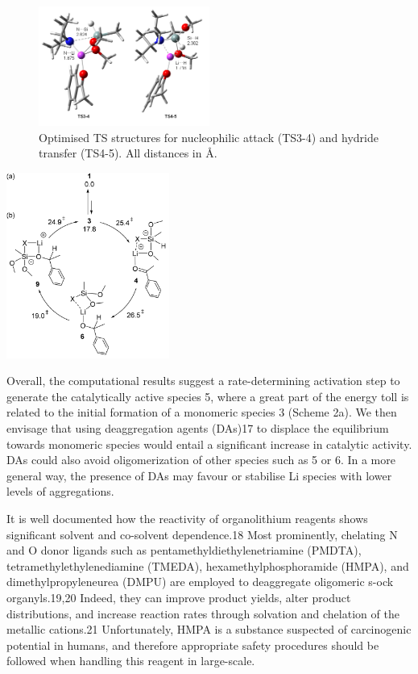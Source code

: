 \documentclass[journal=jacsat,manuscript=article]{achemso}
\begin{document}
	\begin{figure}[H]
		\includegraphics[width=0.5\textwidth]{figures/Nucleophilic attack.PNG}	
		\centering
		\caption{Optimised TS structures for nucleophilic attack (TS3-4) and hydride transfer (TS4-5). All distances in \si{\angstrom}.}
		\label{Figure1}
	\end{figure}	
	
	\begin{scheme}[H]
		\includegraphics[width=0.4\textwidth]{figures/Cycle.PNG}		
		\centering
		\caption{Computed (a) pre-activation step and (b) catalytic cycle the alkoxy-silicate-mediated Li-catalysed hydrosilylation of acetophenone. All Gibbs energies are given in THF in kcal mol-1.}
		\label{Scheme 3}
	\end{scheme}	
	
	Overall, the computational results suggest a rate-determining activation step to generate the catalytically active species 5, where a great part of the energy toll is related to the initial formation of a monomeric species 3 (Scheme 2a). We then envisage that using deaggregation agents (DAs)17 to displace the equilibrium towards monomeric species would entail a significant	increase in catalytic activity. DAs could also avoid oligomerization of other species such as 5 or 6. In a more general	way, the presence of DAs may favour or stabilise Li species	with lower levels of aggregations. 
	
	It is well documented how the reactivity of organolithium reagents shows significant solvent and co-solvent dependence.18 Most prominently, chelating N and O donor ligands such as pentamethyldiethylenetriamine (PMDTA), tetramethylethylenediamine 	(TMEDA), hexamethylphosphoramide (HMPA), and dimethylpropyleneurea (DMPU) are employed to deaggregate oligomeric s-ock organyls.19,20 Indeed, they can improve product yields, alter product distributions, and increase reaction rates through solvation and chelation of the metallic cations.21 Unfortunately, HMPA is a substance suspected	of carcinogenic potential in humans, and therefore appropriate safety procedures should be followed when handling this reagent in large-scale. 
	
\end{document}
